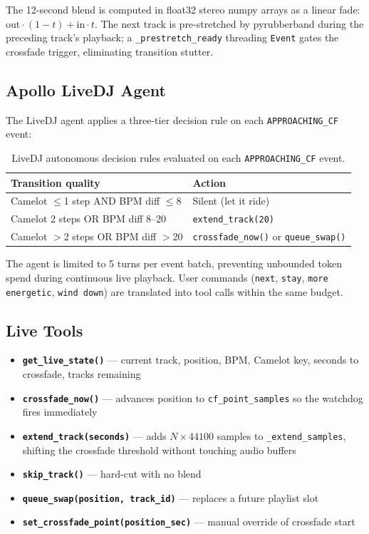 \documentclass[11pt,a4paper]{article}
\begin{document}
The 12-second blend is computed in float32 stereo numpy arrays as a linear
fade: $\text{out}\cdot(1-t) + \text{in}\cdot t$. The next track is
pre-stretched by pyrubberband during the preceding track's playback; a
\texttt{\_prestretch\_ready} threading \texttt{Event} gates the crossfade
trigger, eliminating transition stutter.

\subsection{Apollo LiveDJ Agent}

The LiveDJ agent applies a three-tier decision rule on each
\texttt{APPROACHING\_CF} event:

\begin{table}[h]
\centering
\small
\begin{tabular}{@{}p{5.5cm}l@{}}
\toprule
\textbf{Transition quality} & \textbf{Action} \\
\midrule
Camelot $\leq$1 step AND BPM diff $\leq$8 & Silent (let it ride) \\
Camelot 2 steps OR BPM diff 8--20 & \texttt{extend\_track(20)} \\
Camelot $>$2 steps OR BPM diff $>$20 & \texttt{crossfade\_now()} or \texttt{queue\_swap()} \\
\bottomrule
\end{tabular}
\caption{LiveDJ autonomous decision rules evaluated on each
\texttt{APPROACHING\_CF} event.}
\label{tab:livedj}
\end{table}

The agent is limited to 5 turns per event batch, preventing unbounded token
spend during continuous live playback. User commands
(\texttt{next}, \texttt{stay}, \texttt{more energetic}, \texttt{wind down})
are translated into tool calls within the same budget.

\subsection{Live Tools}

\begin{itemize}
  \item \textbf{\texttt{get\_live\_state()}} --- current track, position,
        BPM, Camelot key, seconds to crossfade, tracks remaining
  \item \textbf{\texttt{crossfade\_now()}} --- advances position to
        \texttt{cf\_point\_samples} so the watchdog fires immediately
  \item \textbf{\texttt{extend\_track(seconds)}} --- adds
        $N \times 44100$ samples to \texttt{\_extend\_samples}, shifting the
        crossfade threshold without touching audio buffers
  \item \textbf{\texttt{skip\_track()}} --- hard-cut with no blend
  \item \textbf{\texttt{queue\_swap(position, track\_id)}} --- replaces a
        future playlist slot
  \item \textbf{\texttt{set\_crossfade\_point(position\_sec)}} --- manual
        override of crossfade start
\end{itemize}
\end{document}
